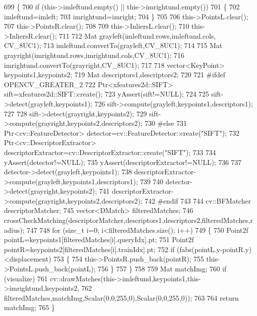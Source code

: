 \begin{DoxyCode}
699 \{
700     \textcolor{keywordflow}{if} (this->imleftund.empty() || this->imrightund.empty())
701     \{
702         imleftund=imleft;
703         imrightund=imright;
704     \}
705 
706     this->PointsL.clear();
707     this->PointsR.clear();
708 
709     this->InliersL.clear();
710     this->InliersR.clear();
711 
712     Mat grayleft(imleftund.rows,imleftund.cols, CV\_8UC1);
713     imleftund.convertTo(grayleft,CV\_8UC1);
714 
715     Mat grayright(imrightund.rows,imrightund.cols,CV\_8UC1);
716     imrightund.convertTo(grayright,CV\_8UC1);
717 
718     vector<KeyPoint> keypoints1,keypoints2;
719     Mat descriptors1,descriptors2;
720 
721 \textcolor{preprocessor}{#ifdef OPENCV\_GREATER\_2}
722     Ptr<xfeatures2d::SIFT> sift=xfeatures2d::SIFT::create();
723     yAssert(sift!=NULL);
724 
725     sift->detect(grayleft,keypoints1);
726     sift->compute(grayleft,keypoints1,descriptors1);
727 
728     sift->detect(grayright,keypoints2);
729     sift->compute(grayright,keypoints2,descriptors2);
730 \textcolor{preprocessor}{#else}
731     Ptr<cv::FeatureDetector> detector=cv::FeatureDetector::create(\textcolor{stringliteral}{"SIFT"});
732     Ptr<cv::DescriptorExtractor> descriptorExtractor=cv::DescriptorExtractor::create(\textcolor{stringliteral}{"SIFT"});
733 
734     yAssert(detector!=NULL);
735     yAssert(descriptorExtractor!=NULL);
736 
737     detector->detect(grayleft,keypoints1);
738     descriptorExtractor->compute(grayleft,keypoints1,descriptors1);
739 
740     detector->detect(grayright,keypoints2);
741     descriptorExtractor->compute(grayright,keypoints2,descriptors2);
742 \textcolor{preprocessor}{#endif}
743     
744     cv::BFMatcher descriptorMatcher;
745     vector<DMatch> filteredMatches;
746     crossCheckMatching(descriptorMatcher,descriptors1,descriptors2,filteredMatches,radius);
747 
748     \textcolor{keywordflow}{for} (\textcolor{keywordtype}{size\_t} i=0; i<filteredMatches.size(); i++)
749     \{
750         Point2f pointL=keypoints1[filteredMatches[i].queryIdx].pt;
751         Point2f pointR=keypoints2[filteredMatches[i].trainIdx].pt;
752         \textcolor{keywordflow}{if} (fabs(pointL.y-pointR.y)<displacement)
753         \{
754             this->PointsR.push\_back(pointR);
755             this->PointsL.push\_back(pointL);
756         \}
757     \}
758 
759     Mat matchImg;
760     \textcolor{keywordflow}{if} (visualize)
761         cv::drawMatches(this->imleftund,keypoints1,this->imrightund,keypoints2,
762                 filteredMatches,matchImg,Scalar(0,0,255,0),Scalar(0,0,255,0));
763 
764     \textcolor{keywordflow}{return} matchImg;
765 \}
\end{DoxyCode}
